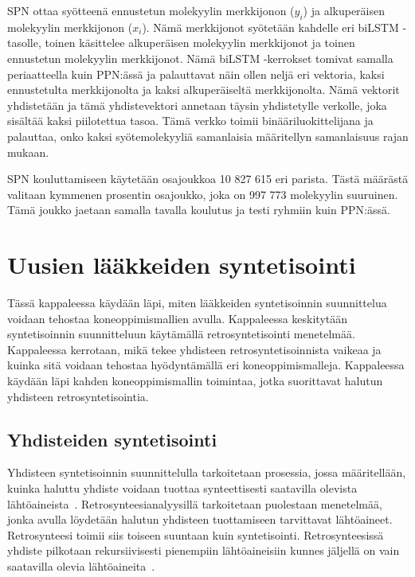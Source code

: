 \documentclass[finnish,twoside,censored,tkt,sw-line]{HYthesisML}
\begin{document}
SPN ottaa syötteenä ennustetun molekyylin merkkijonon (\(y_i\)) ja alkuperäisen molekyylin merkkijonon (\(x_i\)).
Nämä merkkijonot syötetään kahdelle eri biLSTM -tasolle, toinen käsittelee alkuperäisen molekyylin merkkijonot ja toinen ennustetun molekyylin merkkijonot.
Nämä biLSTM -kerrokset tomivat samalla periaatteella kuin PPN:ässä ja palauttavat näin ollen neljä eri vektoria, kaksi ennustetulta merkkijonolta ja kaksi alkuperäiseltä merkkijonolta.
Nämä vektorit yhdistetään ja tämä yhdistevektori annetaan täysin yhdistetylle verkolle, joka sisältää kaksi piilotettua tasoa.
Tämä verkko toimii binääriluokittelijana ja palauttaa, onko kaksi syötemolekyyliä samanlaisia määritellyn samanlaisuus rajan mukaan.

SPN kouluttamiseen käytetään osajoukkoa 10 827 615 eri parista.
Tästä määrästä valitaan kymmenen prosentin osajoukko, joka on 997 773 molekyylin suuruinen.
Tämä joukko jaetaan samalla tavalla koulutus ja testi ryhmiin kuin PPN:ässä.

\chapter{Uusien lääkkeiden syntetisointi}

Tässä kappaleessa käydään läpi, miten lääkkeiden syntetisoinnin suunnittelua voidaan tehostaa koneoppimismallien avulla.
Kappaleessa keskitytään syntetisoinnin suunnitteluun käytämällä retrosyntetisointi menetelmää.
Kappaleessa kerrotaan, mikä tekee yhdisteen retrosyntetisoinnista vaikeaa ja kuinka sitä voidaan tehostaa hyödyntämällä eri koneoppimismalleja.
Kappaleessa käydään läpi kahden koneoppimismallin toimintaa, jotka suorittavat halutun yhdisteen retrosyntetisointia.

\section{Yhdisteiden syntetisointi}

Yhdisteen syntetisoinnin suunnittelulla tarkoitetaan prosessia, jossa määritellään, kuinka haluttu yhdiste voidaan tuottaa synteettisesti saatavilla olevista lähtöaineista~\cite{ColeyConnorW2018MLiC}.
Retrosynteesianalyysillä tarkoitetaan puolestaan menetelmää, jonka avulla löydetään halutun yhdisteen tuottamiseen tarvittavat lähtöaineet.
Retrosynteesi toimii siis toiseen suuntaan kuin syntetisointi.
Retrosynteesissä yhdiste pilkotaan rekursiivisesti pienempiin lähtöaineisiin kunnes jäljellä on vain saatavilla olevia lähtöaineita~\cite{ECoreyRetrosynthesis}.
\end{document}
